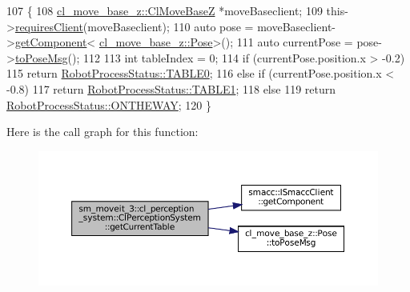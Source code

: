 \begin{DoxyCode}
107     \{
108         \hyperlink{classcl__move__base__z_1_1ClMoveBaseZ}{cl\_move\_base\_z::ClMoveBaseZ} *moveBaseclient;
109         this->\hyperlink{classsmacc_1_1ISmaccClient_a7a9990a2f3e35d547671188d69fee520}{requiresClient}(moveBaseclient);
110         \textcolor{keyword}{auto} pose = moveBaseclient->\hyperlink{classsmacc_1_1ISmaccClient_adef78db601749ca63c19e74a27cb88cc}{getComponent}<
      \hyperlink{classcl__move__base__z_1_1Pose}{cl\_move\_base\_z::Pose}>();
111         \textcolor{keyword}{auto} currentPose = pose->\hyperlink{classcl__move__base__z_1_1Pose_a9faf8c6b437ff6b19c8bddd692908dca}{toPoseMsg}();
112 
113         \textcolor{keywordtype}{int} tableIndex = 0;
114         \textcolor{keywordflow}{if} (currentPose.position.x > -0.2)
115             \textcolor{keywordflow}{return} \hyperlink{namespacesm__moveit__3_1_1cl__perception__system_a627f57ce4b1b2a0daa56d1b3c51c37eca1fd65c0ced0ead229bf6dd6a59067a4f}{RobotProcessStatus::TABLE0};
116         \textcolor{keywordflow}{else} \textcolor{keywordflow}{if} (currentPose.position.x < -0.8)
117             \textcolor{keywordflow}{return} \hyperlink{namespacesm__moveit__3_1_1cl__perception__system_a627f57ce4b1b2a0daa56d1b3c51c37eca5b22e42e5d94a94037a4486a4976c49d}{RobotProcessStatus::TABLE1};
118         \textcolor{keywordflow}{else}
119             \textcolor{keywordflow}{return} \hyperlink{namespacesm__moveit__3_1_1cl__perception__system_a627f57ce4b1b2a0daa56d1b3c51c37eca92f7ea3097b3fdb1b7a25669cfc1b8bd}{RobotProcessStatus::ONTHEWAY};
120     \}
\end{DoxyCode}
Here is the call graph for this function\+:
\nopagebreak
\begin{figure}[H]
\begin{center}
\leavevmode
\includegraphics[width=350pt]{classsm__moveit__3_1_1cl__perception__system_1_1ClPerceptionSystem_a6abfb0c37f72ea92986d3d007f668dbb_cgraph}
\end{center}
\end{figure}
\mbox{\label{classsm__moveit__3_1_1cl__perception__system_1_1ClPerceptionSystem_a35d80131bec4a63ab939667865e7d08d}} 
